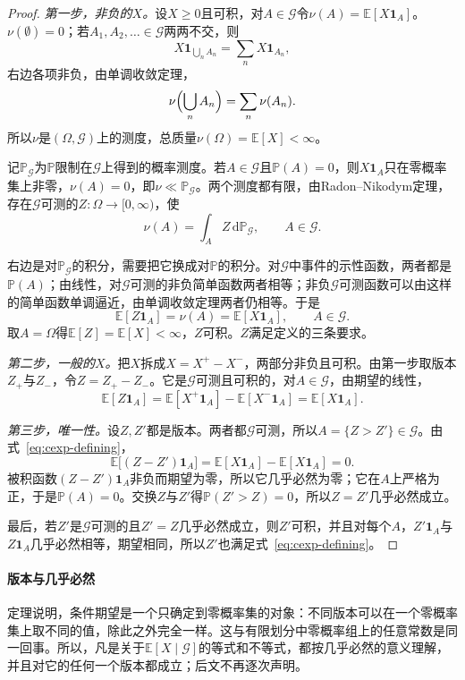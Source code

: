 \begin{proof}
\emph{第一步，非负的$X$。}设$X\geq0$且可积，对$A\in\mathcal{G}$令$\nu(A)=\mathbb{E}[X\mathbf{1}_{A}]$。$\nu(\emptyset)=0$；若$A_1,A_2,\dots\in\mathcal{G}$两两不交，则
\[
 X\mathbf{1}_{\bigcup_nA_n}=\sum_nX\mathbf{1}_{A_n},
\]
右边各项非负，由单调收敛定理，
\[
 \nu\Bigl(\bigcup_nA_n\Bigr)=\sum_n\nu(A_n).
\]
所以$\nu$是$(\Omega,\mathcal{G})$上的测度，总质量$\nu(\Omega)=\mathbb{E}[X]<\infty$。

记$\mathbb{P}_{\mathcal{G}}$为$\mathbb{P}$限制在$\mathcal{G}$上得到的概率测度。若$A\in\mathcal{G}$且$\mathbb{P}(A)=0$，则$X\mathbf{1}_{A}$只在零概率集上非零，$\nu(A)=0$，即$\nu\ll\mathbb{P}_{\mathcal{G}}$。两个测度都有限，由Radon--Nikodym定理，存在$\mathcal{G}$可测的$Z:\Omega\to[0,\infty)$，使
\[
 \nu(A)=\int_{A}Z\,\mathrm{d}\mathbb{P}_{\mathcal{G}},\qquad A\in\mathcal{G}.
\]

右边是对$\mathbb{P}_{\mathcal{G}}$的积分，需要把它换成对$\mathbb{P}$的积分。对$\mathcal{G}$中事件的示性函数，两者都是$\mathbb{P}(A)$；由线性，对$\mathcal{G}$可测的非负简单函数两者相等；非负$\mathcal{G}$可测函数可以由这样的简单函数单调逼近，由单调收敛定理两者仍相等。于是
\[
 \mathbb{E}[Z\mathbf{1}_{A}]=\nu(A)=\mathbb{E}[X\mathbf{1}_{A}],\qquad A\in\mathcal{G}.
\]
取$A=\Omega$得$\mathbb{E}[Z]=\mathbb{E}[X]<\infty$，$Z$可积。$Z$满足定义的三条要求。

\emph{第二步，一般的$X$。}把$X$拆成$X=X^{+}-X^{-}$，两部分非负且可积。由第一步取版本$Z_{+}$与$Z_{-}$，令$Z=Z_{+}-Z_{-}$。它是$\mathcal{G}$可测且可积的，对$A\in\mathcal{G}$，由期望的线性，
\[
 \mathbb{E}[Z\mathbf{1}_{A}]=\mathbb{E}[X^{+}\mathbf{1}_{A}]-\mathbb{E}[X^{-}\mathbf{1}_{A}]=\mathbb{E}[X\mathbf{1}_{A}] .
\]

\emph{第三步，唯一性。}设$Z,Z'$都是版本。两者都$\mathcal{G}$可测，所以$A=\{Z>Z'\}\in\mathcal{G}$。由式~\eqref{eq:cexp-defining}，
\[
 \mathbb{E}\bigl[(Z-Z')\mathbf{1}_{A}\bigr]=\mathbb{E}[X\mathbf{1}_{A}]-\mathbb{E}[X\mathbf{1}_{A}]=0 .
\]
被积函数$(Z-Z')\mathbf{1}_{A}$非负而期望为零，所以它几乎必然为零；它在$A$上严格为正，于是$\mathbb{P}(A)=0$。交换$Z$与$Z'$得$\mathbb{P}(Z'>Z)=0$，所以$Z=Z'$几乎必然成立。

最后，若$Z'$是$\mathcal{G}$可测的且$Z'=Z$几乎必然成立，则$Z'$可积，并且对每个$A$，$Z'\mathbf{1}_{A}$与$Z\mathbf{1}_{A}$几乎必然相等，期望相同，所以$Z'$也满足式~\eqref{eq:cexp-defining}。
\end{proof}

\paragraph{版本与几乎必然}
定理说明，条件期望是一个只确定到零概率集的对象：不同版本可以在一个零概率集上取不同的值，除此之外完全一样。这与有限划分中零概率组上的任意常数是同一回事。所以，凡是关于$\mathbb{E}[X\mid\mathcal{G}]$的等式和不等式，都按几乎必然的意义理解，并且对它的任何一个版本都成立；后文不再逐次声明。


